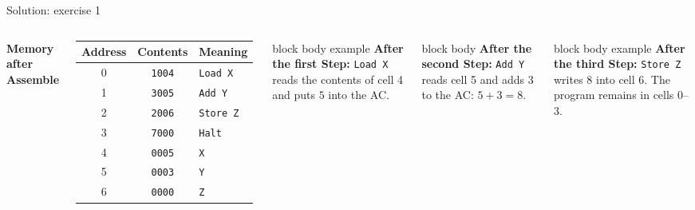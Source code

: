 \documentclass[aspectratio=169,10pt]{beamer}
\begin{document}
\begin{frame}{Solution: exercise 1}
  \begin{columns}[T,onlytextwidth]
      \centering
      \footnotesize\textbf{Memory after Assemble}\\[0.08cm]
      \scriptsize
      \renewcommand{\arraystretch}{1.2}
      \begin{tabular}{ccl}
        \toprule
        \textbf{Address} & \textbf{Contents} & \textbf{Meaning} \\
        \midrule
        0 & \texttt{1004} & \texttt{Load X} \\
        1 & \texttt{3005} & \texttt{Add Y} \\
        2 & \texttt{2006} & \texttt{Store Z} \\
        3 & \texttt{7000} & \texttt{Halt} \\
        4 & \texttt{0005} & \texttt{X} \\
        5 & \texttt{0003} & \texttt{Y} \\
        6 & \texttt{0000} & \texttt{Z} \\
        \bottomrule
      \end{tabular}
      \begin{beamercolorbox}[rounded=true,sep=0.11cm,wd=\linewidth]{block body example}
        \footnotesize
        \textbf{After the first Step:} \texttt{Load X} reads the contents of cell 4 and puts $5$ into the AC.
      \end{beamercolorbox}
      \vspace{0.08cm}
      \begin{beamercolorbox}[rounded=true,sep=0.11cm,wd=\linewidth]{block body}
        \footnotesize
        \textbf{After the second Step:} \texttt{Add Y} reads cell 5 and adds $3$ to the AC: $5+3=8$.
      \end{beamercolorbox}
      \vspace{0.08cm}
      \begin{beamercolorbox}[rounded=true,sep=0.11cm,wd=\linewidth]{block body example}
        \footnotesize
        \textbf{After the third Step:} \texttt{Store Z} writes $8$ into cell 6. The program remains in cells 0--3.
      \end{beamercolorbox}
  \end{columns}
\end{frame}
\end{document}
